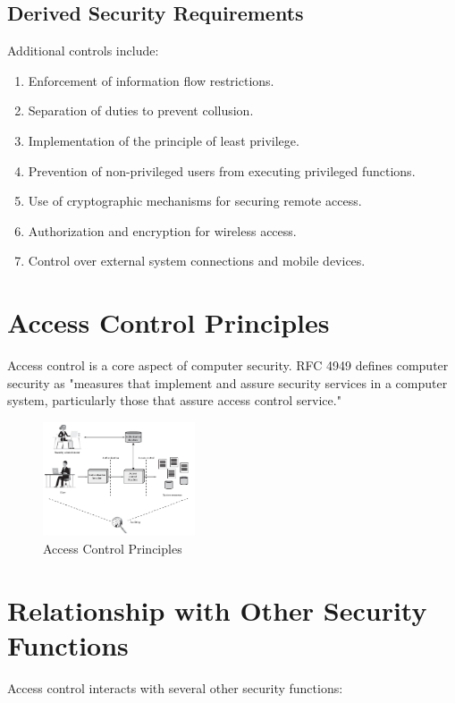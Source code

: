 \subsection{Derived Security Requirements}
Additional controls include:

\begin{enumerate}
    \item Enforcement of information flow restrictions.
    \item Separation of duties to prevent collusion.
    \item Implementation of the principle of least privilege.
    \item Prevention of non-privileged users from executing privileged
      functions.
    \item Use of cryptographic mechanisms for securing remote access.
    \item Authorization and encryption for wireless access.
    \item Control over external system connections and mobile devices.
\end{enumerate}

\section{Access Control Principles}
Access control is a core aspect of computer security. RFC 4949 defines
computer security as "measures that implement and assure security
services in a computer system, particularly those that assure access
control service."

\begin{figure}[H]
  \centering
  \includegraphics[width=0.4\textwidth]{img/Access Control Principles.png}
  \caption{Access Control Principles}
\end{figure}


\section{Relationship with Other Security Functions}
Access control interacts with several other security functions:

